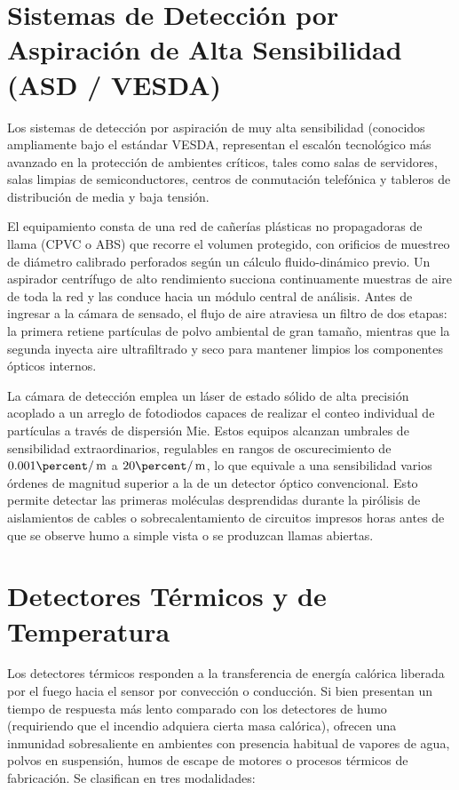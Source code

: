 \section{Sistemas de Detección por Aspiración de Alta Sensibilidad (ASD / VESDA)}

Los sistemas de detección por aspiración de muy alta sensibilidad (conocidos ampliamente bajo el estándar VESDA,
representan el escalón tecnológico más avanzado en la protección de ambientes críticos, tales como salas de servidores,
salas limpias de semiconductores, centros de conmutación telefónica y tableros de distribución de media y baja tensión.

El equipamiento consta de una red de cañerías plásticas no propagadoras de llama (CPVC o ABS) que recorre el volumen
protegido, con orificios de muestreo de diámetro calibrado perforados según un cálculo fluido-dinámico previo. Un
aspirador centrífugo de alto rendimiento succiona continuamente muestras de aire de toda la red y las conduce hacia un
módulo central de análisis. Antes de ingresar a la cámara de sensado, el flujo de aire atraviesa un filtro de dos etapas: la
primera retiene partículas de polvo ambiental de gran tamaño, mientras que la segunda inyecta aire ultrafiltrado y seco
para mantener limpios los componentes ópticos internos.

La cámara de detección emplea un láser de estado sólido de alta precisión acoplado a un arreglo de fotodiodos capaces de
realizar el conteo individual de partículas a través de dispersión Mie. Estos equipos alcanzan umbrales de sensibilidad
extraordinarios, regulables en rangos de oscurecimiento de $0.001\percent/\m$ a $20\percent/\m$, lo que equivale a una
sensibilidad varios órdenes de magnitud superior a la de un detector óptico convencional. Esto permite detectar las
primeras moléculas desprendidas durante la pirólisis de aislamientos de cables o sobrecalentamiento de circuitos impresos
horas antes de que se observe humo a simple vista o se produzcan llamas abiertas.

\section{Detectores Térmicos y de Temperatura}

Los detectores térmicos responden a la transferencia de energía calórica liberada por el fuego hacia el sensor por
convección o conducción. Si bien presentan un tiempo de respuesta más lento comparado con los detectores de humo
(requiriendo que el incendio adquiera cierta masa calórica), ofrecen una inmunidad sobresaliente en ambientes con presencia
habitual de vapores de agua, polvos en suspensión, humos de escape de motores o procesos térmicos de fabricación. Se
clasifican en tres modalidades:


